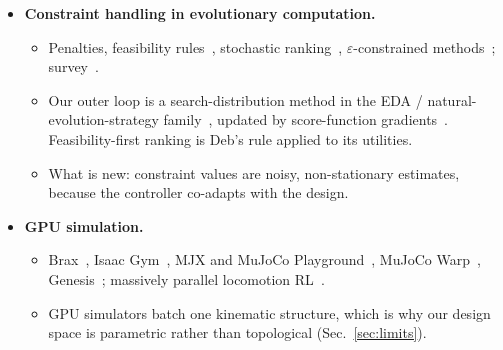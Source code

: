 \documentclass[sigconf,review]{acmart}
\newcommand{\statustag}[2]{\textcolor{#1}{\textsf{\scriptsize\bfseries[#2]}}}
\newcommand{\CHECK}{\statustag{orange!85!black}{CHECK}\hspace{0.3em}}
\begin{document}
\begin{itemize}
\begin{itemize}
  \item Literature search (2026-09-29, Semantic Scholar, arXiv and OpenAlex): of 911 papers citing 11 co-design seed papers, 57 mention safety and none trains the controller with constrained RL; of 2,552 papers citing 5 safe-RL seed papers, 21 mention design or morphology and none optimises a body. \CHECK{} update.
  \item Positioning: the first to put a budgeted, constrained-RL inner loop \emph{and} constraint handling into the design loop.
  \end{itemize}
\item \textbf{Constraint handling in evolutionary computation.}
  \begin{itemize}
  \item Penalties, feasibility rules~\cite{deb2000efficient}, stochastic ranking~\cite{runarsson2000stochastic}, $\varepsilon$-constrained methods~\cite{takahama2006constrained}; survey~\cite{coello2002theoretical}.
  \item Our outer loop is a search-distribution method in the EDA / natural-evolution-strategy family~\cite{larranaga2002estimation,wierstra2014natural}, updated by score-function gradients~\cite{williams1992simple}. Feasibility-first ranking is Deb's rule applied to its utilities.
  \item What is new: constraint values are noisy, non-stationary estimates, because the controller co-adapts with the design.
  \end{itemize}
\item \textbf{GPU simulation.}
  \begin{itemize}
  \item Brax~\cite{freeman2021brax}, Isaac Gym~\cite{makoviychuk2021isaac}, MJX and MuJoCo Playground~\cite{zakka2025playground}, MuJoCo Warp~\cite{mujocowarp2025}, Genesis~\cite{genesis2024}; massively parallel locomotion RL~\cite{rudin2022learning}.
  \item GPU simulators batch one kinematic structure, which is why our design space is parametric rather than topological (Sec.~\ref{sec:limits}).
  \end{itemize}
\end{itemize}

\end{document}
